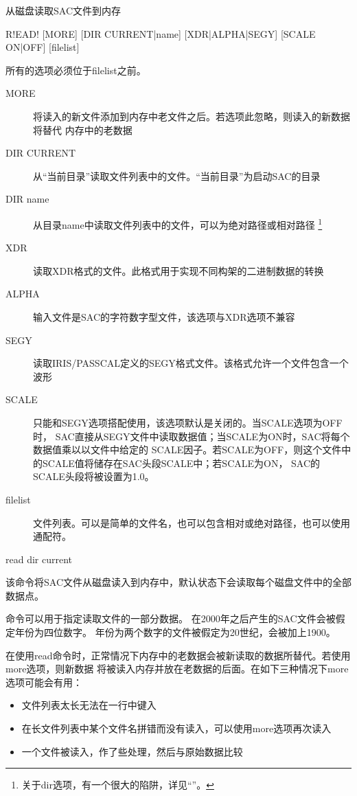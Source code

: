 \label{cmd:read}

从磁盘读取SAC文件到内存

\begin{SACSTX}
R!EAD! [MORE] [DIR CURRENT|name] [XDR|ALPHA|SEGY]
    [SCALE ON|OFF] [filelist]
\end{SACSTX}
所有的选项必须位于filelist之前。

\begin{description}
\item [MORE] 将读入的新文件添加到内存中老文件之后。若选项此忽略，则读入的新数据将替代
    内存中的老数据
\item [DIR CURRENT] 从``当前目录''读取文件列表中的文件。``当前目录''为启动SAC的目录
\item [DIR name] 从目录name中读取文件列表中的文件，可以为绝对路径或相对路径
    \footnote{关于dir选项，有一个很大的陷阱，详见``''。}
\item [XDR] 读取XDR格式的文件。此格式用于实现不同构架的二进制数据的转换
\item [ALPHA] 输入文件是SAC的字符数字型文件，该选项与XDR选项不兼容
\item [SEGY] 读取IRIS/PASSCAL定义的SEGY格式文件。该格式允许一个文件包含一个波形
\item [SCALE] 只能和SEGY选项搭配使用，该选项默认是关闭的。当SCALE选项为OFF时，
    SAC直接从SEGY文件中读取数据值；当SCALE为ON时，SAC将每个数据值乘以以文件中给定的
    SCALE因子。若SCALE为OFF，则这个文件中的SCALE值将储存在SAC头段SCALE中；若SCALE为ON，
    SAC的SCALE头段将被设置为1.0。
\item [filelist] 文件列表。可以是简单的文件名，也可以包含相对或绝对路径，也可以使用
    通配符。
\end{description}

\begin{SACDFT}
read dir current
\end{SACDFT}

该命令将SAC文件从磁盘读入到内存中，默认状态下会读取每个磁盘文件中的全部数据点。

 命令可以用于指定读取文件的一部分数据。
在2000年之后产生的SAC文件会被假定年份为四位数字。
年份为两个数字的文件被假定为20世纪，会被加上1900。

在使用read命令时，正常情况下内存中的老数据会被新读取的数据所替代。若使用more选项，则新数据
将被读入内存并放在老数据的后面。在如下三种情况下more选项可能会有用：
\begin{itemize}
\item 文件列表太长无法在一行中键入
\item 在长文件列表中某个文件名拼错而没有读入，可以使用more选项再次读入
\item 一个文件被读入，作了些处理，然后与原始数据比较
\end{itemize}

